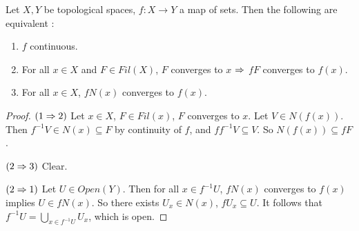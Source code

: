 \documentclass[main.tex]{subfiles}
\begin{document}
\begin{thm} 
  
  Let $X, Y$ be topological spaces, $f : X \to Y$ a map of sets. 
  Then the following are equivalent : 
  \begin{enumerate}
    \item $f$ continuous. 
    \item For all $x \in X$ and $F \in Fil(X)$,
    $F$ converges to $x$ $\Rightarrow$ $fF$ converges to $f(x)$.
    \item For all $x \in X$, $fN(x)$ converges to $f(x)$.
  \end{enumerate}
\end{thm}
\begin{proof}
  $(1\Rightarrow 2)$
  Let $x \in X$, $F \in Fil(x)$, $F$ converges to $x$. 
  Let $V \in N(f(x))$.
  Then $f^{-1}V \in N(x) \subseteq F$ by continuity of $f$,
  and $f f^{-1} V \subseteq V$.
  So $N(f(x)) \subseteq f F$.

  $(2\Rightarrow 3)$ Clear. 

  $(2\Rightarrow 1)$ 
  Let $U \in Open(Y)$.
  Then for all $x \in f^{-1}U$,
  $fN(x)$ converges to $f(x)$ implies $U \in fN(x)$.
  So there exists $U_x \in N(x)$, $fU_x \subseteq U$.
  It follows that $f^{-1}U = \bigcup_{x \in f^{-1}U} U_x$, 
  which is open. 
\end{proof}
\end{document}

